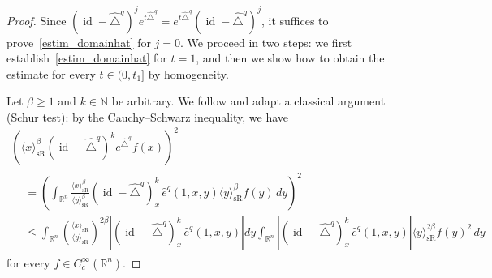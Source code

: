\documentclass[10pt]{amsart}
\theoremstyle{definition}\newtheorem{defi}[theo]{Definition}\newtheorem{rema}[theo]{Remark}\newtheorem{exam}[theo]{Example}\newtheorem{exem}[theo]{Example}\newtheorem{nota}[theo]{Notation}
\newcommand*\R{\mathbb{R}}
\newcommand*\N{\mathbb{N}}
\DeclareMathOperator{\id}{id}
\DeclareMathOperator{\sR}{sR}
\renewcommand{\geq}{\geqslant}
\renewcommand{\leq}{\leqslant}
\begin{document}
\begin{proof}
Since $(\id - \widehat{\triangle}^q)^j e^{t\widehat{\triangle}^q} = e^{t\widehat{\triangle}^q} (\id - \widehat{\triangle}^q)^j$, it suffices to prove~\eqref{estim_domainhat} for $j=0$. We proceed in two steps: we first establish~\eqref{estim_domainhat} for $t=1$, and then we show how to obtain the estimate for every $t\in(0,t_1]$ by homogeneity.

Let $\beta\geq 1$ and $k\in\N$ be arbitrary. We follow and adapt a classical argument (Schur test): by the Cauchy--Schwarz inequality, we have
\begin{multline}\label{ineg_schur}
\left(\langle x\rangle_{\sR}^\beta \left(\id - \widehat{\triangle}^q\right)^k e^{\widehat{\triangle}^q} f(x) \right)^2\\
\begin{aligned}
&= \left(\int_{\R^n} \frac{\langle x\rangle_{\sR}^\beta}{\langle y\rangle_{\sR}^\beta} \left(\id - \widehat{\triangle}^q\right)_x^k\, \widehat{e}^q(1,x,y) \langle y\rangle_{\sR}^\beta f(y)\, dy \right)^2 \\
&\leq \int_{\R^n} \left(\frac{\langle x\rangle_{\sR}}{\langle y\rangle_{\sR}} \right)^{2\beta} \!\left\vert \left(\id - \widehat{\triangle}^q\right)_x^k\, \widehat{e}^q(1,x,y) \right\vert\! dy \int_{\R^n} \left\vert \left(\id - \widehat{\triangle}^q\right)_x^k\, \widehat{e}^q(1,x,y) \right\vert \langle y\rangle_{\sR}^{2\beta} f(y)^2\, dy
\end{aligned}
\end{multline}
for every $f\in C^\infty_c(\R^n)$.


\end{proof}
\end{document}
